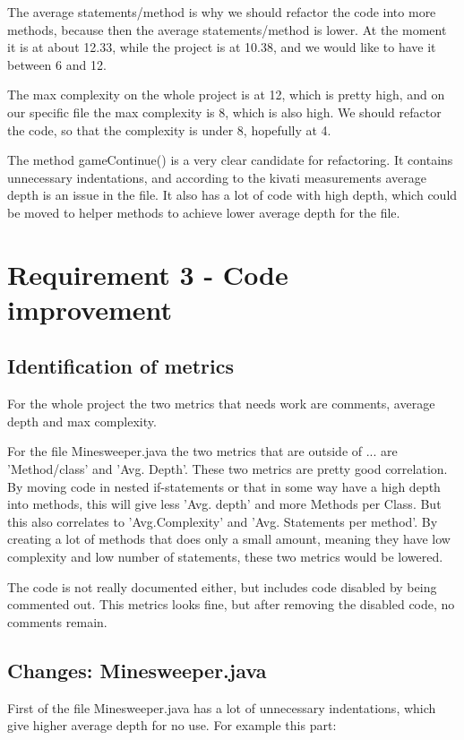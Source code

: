 \documentclass[UKenglish]{article}  %
\begin{document}
The average statements/method is why we should refactor the code into more
methods, because then the average statements/method is lower. At the moment it
is at about 12.33, while the project is at 10.38, and we would like to have it
between 6 and 12.

The max complexity on the whole project is at 12, which is pretty high, and on
our specific file the max complexity is 8, which is also high. We should
refactor the code, so that the complexity is under 8, hopefully at 4.

The method gameContinue() is a very clear candidate for refactoring. It contains
unnecessary indentations, and according to the kivati measurements average depth
is an issue in the file. It also has a lot of code with high depth, which could
be moved to helper methods to achieve lower average depth for the file.

\section{Requirement 3 - Code improvement}
\subsection{Identification of metrics} For the whole project the two metrics
that needs work are comments, average depth and max complexity.

For the file Minesweeper.java the two metrics that are outside of ... are
'Method/class' and 'Avg. Depth'. These two metrics are pretty good correlation.
By moving code in nested if-statements or that in some way have a high depth
into methods, this will give less 'Avg. depth' and more Methods per Class. But
this also correlates to 'Avg.Complexity' and 'Avg. Statements per method'. By
creating a lot of methods that does only a small amount, meaning they have low
complexity and low number of statements, these two metrics would be lowered.

The code is not really documented either, but includes code disabled by being
commented out. This metrics looks fine, but after removing the disabled code, no
comments remain.

\subsection{Changes: Minesweeper.java} First of the file Minesweeper.java has a
lot of unnecessary indentations, which give higher average depth for no use. For
example this part:
\end{document}
